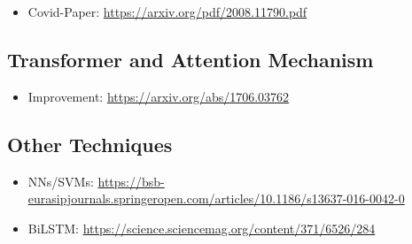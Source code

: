\begin{itemize}
	\item Covid-Paper: \url{https://arxiv.org/pdf/2008.11790.pdf}
\end{itemize}


\subsection{Transformer and Attention Mechanism} \label{fundamentalsH}

\begin{itemize}
	\item Improvement: \url{https://arxiv.org/abs/1706.03762}
\end{itemize}


\subsection{Other Techniques} \label{fundamentalsI}

\begin{itemize}
	\item NNs/SVMs: \url{https://bsb-eurasipjournals.springeropen.com/articles/10.1186/s13637-016-0042-0}
	\item BiLSTM: \url{https://science.sciencemag.org/content/371/6526/284}
\end{itemize}


\newpage
